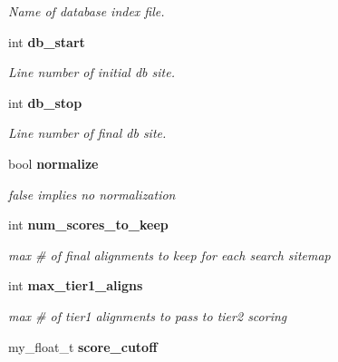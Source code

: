 \begin{CompactItemize}
\begin{CompactList}\small\item\em Name of database index file. \item\end{CompactList}\item 
int \bf{db\_\-start}\label{classASCbase_1_1SearchParameters_2cd53037b00008f5039381a00085f93d}

\begin{CompactList}\small\item\em Line number of initial db site. \item\end{CompactList}\item 
int \bf{db\_\-stop}\label{classASCbase_1_1SearchParameters_b12f931a64c6d18141bb94cb283c1543}

\begin{CompactList}\small\item\em Line number of final db site. \item\end{CompactList}\item 
bool \bf{normalize}\label{classASCbase_1_1SearchParameters_4265eb5c3b8cd524159bcefd855458fa}

\begin{CompactList}\small\item\em false implies no normalization \item\end{CompactList}\item 
int \bf{num\_\-scores\_\-to\_\-keep}\label{classASCbase_1_1SearchParameters_275f0141e87e686c4c8ee55d9062ae81}

\begin{CompactList}\small\item\em max \# of final alignments to keep for each search sitemap \item\end{CompactList}\item 
int \bf{max\_\-tier1\_\-aligns}\label{classASCbase_1_1SearchParameters_d8fa144982e1f3a459b6797170fec1e9}

\begin{CompactList}\small\item\em max \# of tier1 alignments to pass to tier2 scoring \item\end{CompactList}\item 
my\_\-float\_\-t \bf{score\_\-cutoff}\label{classASCbase_1_1SearchParameters_2ee1752f506f23f99dc8639465c83015}


\end{CompactItemize}
